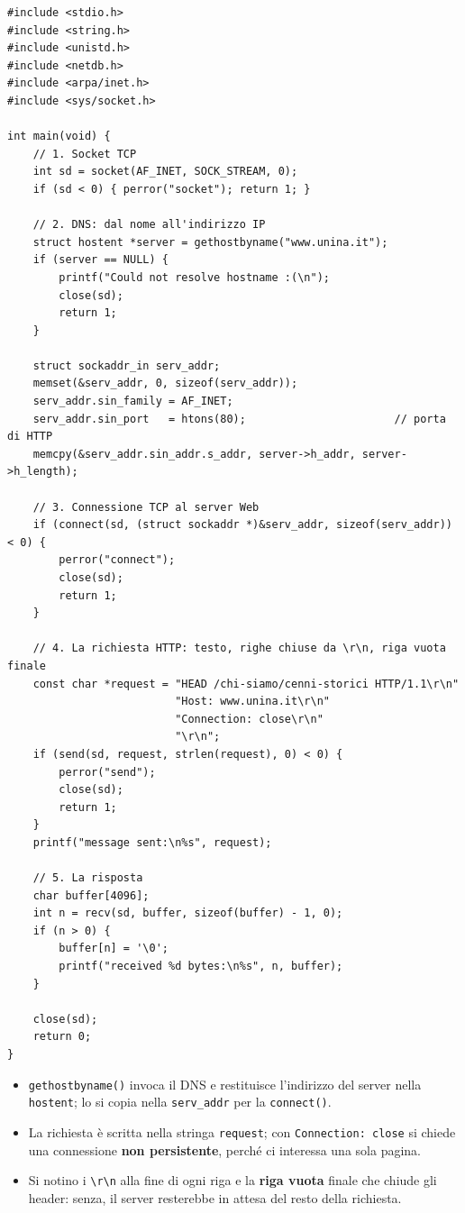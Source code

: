 \begin{lstlisting}[language={[POSIX]C}, style=wnumbers, title={http\_head.c}]
#include <stdio.h>
#include <string.h>
#include <unistd.h>
#include <netdb.h>
#include <arpa/inet.h>
#include <sys/socket.h>

int main(void) {
    // 1. Socket TCP
    int sd = socket(AF_INET, SOCK_STREAM, 0);
    if (sd < 0) { perror("socket"); return 1; }

    // 2. DNS: dal nome all'indirizzo IP
    struct hostent *server = gethostbyname("www.unina.it");
    if (server == NULL) {
        printf("Could not resolve hostname :(\n");
        close(sd);
        return 1;
    }

    struct sockaddr_in serv_addr;
    memset(&serv_addr, 0, sizeof(serv_addr));
    serv_addr.sin_family = AF_INET;
    serv_addr.sin_port   = htons(80);                       // porta di HTTP
    memcpy(&serv_addr.sin_addr.s_addr, server->h_addr, server->h_length);

    // 3. Connessione TCP al server Web
    if (connect(sd, (struct sockaddr *)&serv_addr, sizeof(serv_addr)) < 0) {
        perror("connect");
        close(sd);
        return 1;
    }

    // 4. La richiesta HTTP: testo, righe chiuse da \r\n, riga vuota finale
    const char *request = "HEAD /chi-siamo/cenni-storici HTTP/1.1\r\n"
                          "Host: www.unina.it\r\n"
                          "Connection: close\r\n"
                          "\r\n";
    if (send(sd, request, strlen(request), 0) < 0) {
        perror("send");
        close(sd);
        return 1;
    }
    printf("message sent:\n%s", request);

    // 5. La risposta
    char buffer[4096];
    int n = recv(sd, buffer, sizeof(buffer) - 1, 0);
    if (n > 0) {
        buffer[n] = '\0';
        printf("received %d bytes:\n%s", n, buffer);
    }

    close(sd);
    return 0;
}
\end{lstlisting}

\begin{itemize}
    \item \texttt{gethostbyname()} invoca il DNS e restituisce l'indirizzo del server nella \texttt{hostent}; lo si
          copia nella \texttt{serv\_addr} per la \texttt{connect()}.
    \item La richiesta è scritta nella stringa \texttt{request}; con \texttt{Connection: close} si chiede una
          connessione \textbf{non persistente}, perché ci interessa una sola pagina.
    \item Si notino i \texttt{\textbackslash r\textbackslash n} alla fine di ogni riga e la \textbf{riga vuota} finale che
          chiude gli header: senza, il server resterebbe in attesa del resto della richiesta.
\end{itemize}

